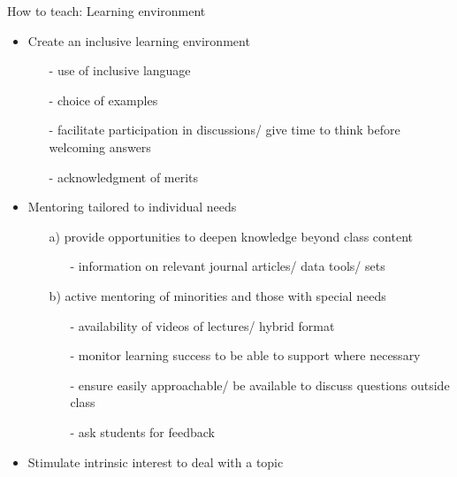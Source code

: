 \begin{frame}{How to teach: Learning environment} %
	\begin{itemize}%
		\item<+-> Create an \alert{inclusive} learning environment %
		\begin{itemize}[<+->]
			\item[-] use of inclusive language
			\item[-] choice of examples
			\item[-] facilitate participation in discussions/ give time to think before welcoming answers
			\item[-] acknowledgment of merits
		\end{itemize}
	\vspace{2mm}
		\item<+-> \alert{Mentoring} tailored to \alert{individual needs}
		\begin{itemize}[<+->]
			\item[a)] provide opportunities to deepen knowledge beyond class content 
			\begin{itemize}
				\item[-] information on relevant journal articles/ data tools/ sets
			\end{itemize}
			\item[b)]  active mentoring of minorities and those with special needs
			\begin{itemize}
				\item[-] availability of videos of lectures/ hybrid format
				\item[-] monitor learning success to be able to support where necessary
				\item[-] ensure easily approachable/ be available to discuss questions outside class
				\item[-] ask students for feedback 
			\end{itemize}
		\end{itemize}		
		\vspace{2mm}		
		\item<+-> Stimulate \alert{intrinsic interest} to deal with a topic 
	\end{itemize}
\end{frame}

